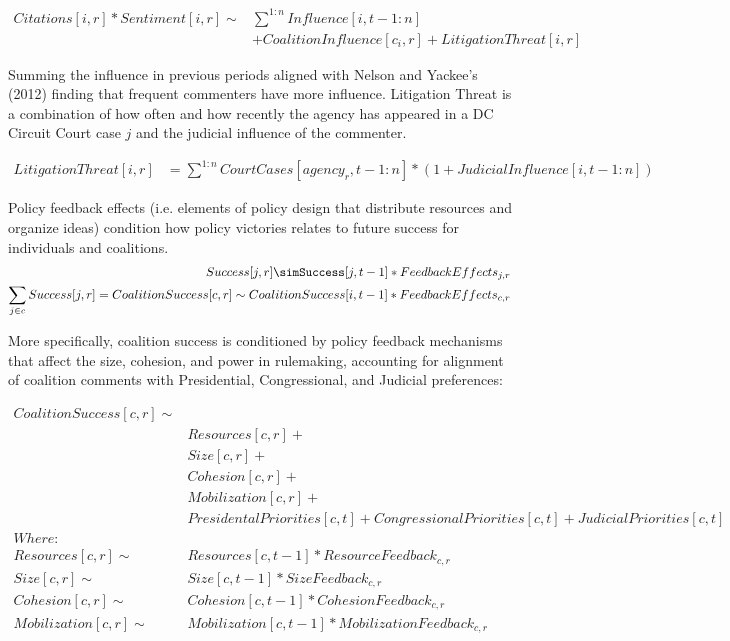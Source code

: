 \begin{align}Citations[i, r]*Sentiment[i, r] \sim &\sum^{1:n} Influence[i, t-1:n] \\&+ CoalitionInfluence[c_i, r] + LitigationThreat[i, r]\end{align}

Summing the influence in previous periods aligned with Nelson and Yackee's (2012) finding that frequent commenters have more influence. %
Litigation Threat is a combination of how often and how recently the agency has appeared in a DC Circuit Court case $j$ and the judicial influence of the commenter. 

\begin{align}LitigationThreat[i, r] &= \sum^{1:n} CourtCases[agency_r, t-1:n]*(1+JudicialInfluence[i, t-1:n])\end{align}

Policy feedback effects (i.e. elements of policy design that distribute resources and organize ideas) condition how policy victories relates to future success for individuals and coalitions. \begin{align}
Success[j, r] \simSuccess[j, t-1]*FeedbackEffects_{j, r}\\
\sum_{j \in c} Success[j, r] = CoalitionSuccess[c, r] \sim CoalitionSuccess[i, t-1]*FeedbackEffects_{c, r}
\end{align}

More specifically, coalition success is conditioned by policy feedback mechanisms that affect the size, cohesion, and power in rulemaking, accounting for alignment of coalition comments with Presidential, Congressional, and Judicial preferences: 

\begin{align}
CoalitionSuccess[c, r] \sim &\\
& Resources[c,r] + \\
& Size[c,r] + \\
& Cohesion[c,r]+ \\
& Mobilization[c, r] +  \\
& PresidentalPriorities[c,t] + CongressionalPriorities[c,t] + JudicialPriorities[c,t]\\
Where: \\
Resources[c,r] \sim & Resources[c, t-1]* ResourceFeedback_{c, r}\\
Size[c,r] \sim & Size[c, t-1]* SizeFeedback_{c, r}\\
Cohesion[c,r] \sim & Cohesion[c, t-1]* CohesionFeedback_{c, r}\\
Mobilization[c, r] \sim & Mobilization[c, t-1]*MobilizationFeedback_{c, r}
\end{align}

